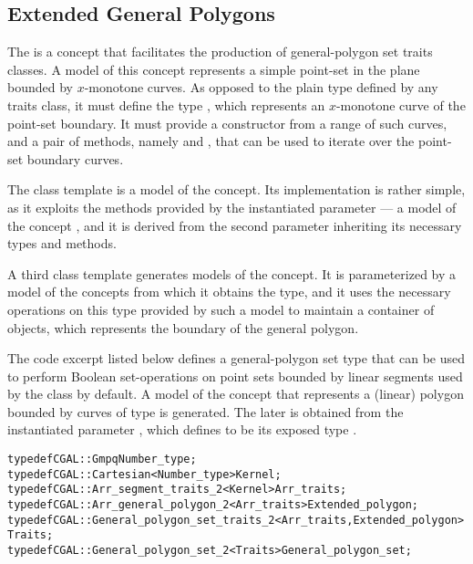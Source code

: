 \subsection{Extended General Polygons}
\label{bobs_ssec:extended_general_polygons}
The  is a concept that facilitates the
production of general-polygon set traits classes. A model of this
concept represents a simple point-set in the plane bounded
by $x$-monotone curves. As opposed to the plain
 type defined by any traits class, it must
define the type , which represents an
$x$-monotone curve of the point-set boundary. It must provide a
constructor from a range of such curves, and a pair of methods, namely
 and , that can be used to
iterate over the point-set boundary curves.
 
The
class template is a model of the 
concept. Its implementation is rather simple, as it exploits the
methods provided by the instantiated parameter
 --- a model of the concept
, and it is derived from the second
parameter  inheriting its necessary types
and methods. 

A third class template
generates models of the  concept. It is
parameterized by a model of the 
concepts from which it obtains the  type, and
it uses the necessary operations on this type provided by such a model
to maintain a container of  objects, which
represents the boundary of the general polygon.

The code excerpt listed below defines a general-polygon set type that
can be used to perform Boolean set-operations on point sets bounded by
linear segments used by the  class by default. A
model of the  concept that represents a
(linear) polygon bounded by curves of type  is
generated. The later is obtained from the instantiated parameter
, which defines  to be
its exposed type .
\begin{alltt}
typedef CGAL::Gmpq                                      Number_type;
typedef CGAL::Cartesian<Number_type>                    Kernel;
typedef CGAL::Arr_segment_traits_2<Kernel>              Arr_traits;
typedef CGAL::Arr_general_polygon_2<Arr_traits>         Extended_polygon;
typedef CGAL::General_polygon_set_traits_2<Arr_traits,Extended_polygon>
                                                        Traits;
typedef CGAL::General_polygon_set_2<Traits>             General_polygon_set;
\end{alltt}

